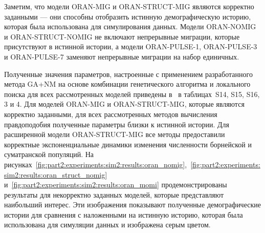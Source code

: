 Заметим, что модели ORAN-MIG и ORAN-STRUCT-MIG являются корректно заданными --- они способны отобразить истинную демографическую историю, которая была использована для симулирования данных.
Модели ORAN-NOMIG и ORAN-STRUCT-NOMIG не включают непрерывные миграции, которые присутствуют в истинной истории, а модели ORAN-PULSE-1, ORAN-PULSE-3 и ORAN-PULSE-7 заменяют непрерывные миграции на набор единичных.

Полученные значения параметров, настроенные с применением разработанного метода GA+NM на основе комбинации генетического алгоритма и локального поиска для всех рассмотренных моделей приведены в~\cite{noskova2023gadma2} в таблицах~S14, S15, S16, 3 и 4.
Для моделей ORAN-MIG и ORAN-STRUCT-MIG, которые являются корректно заданными, для всех рассмотренных методов вычисления правдоподобия полученные параметры близки к истинной истории.
Для расширенной модели ORAN-STRUCT-MIG все методы предоставили корректные экспоненциальные динамики изменения численности борнейской и суматранской популяций.
На рисунках~\ref{fig:part2:experiments:sim2:results:oran_nomig},~\ref{fig:part2:experiments:sim2:results:oran_struct_nomig}~ и~\ref{fig:part2:experiments:sim2:results:oran_momi} продемонстрированы результаты для некорректно заданных моделей, которые представляют наибольший интерес.
Эти изображения показывают полученные демографические истории для сравнения с наложенными на истинную историю, которая была использована для симуляции данных и изображена серым цветом.

